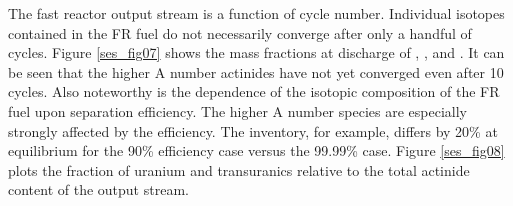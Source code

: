 The fast reactor output stream is a function of cycle number. 
Individual isotopes contained in the FR fuel do not necessarily converge
after only a handful of cycles.  Figure \ref{ses_fig07} shows the mass fractions at
discharge of , ,  and .  
It can be seen that the higher A number actinides have not yet converged even after 10 cycles. 
Also noteworthy is the dependence of the isotopic composition of the FR
fuel upon separation efficiency.  The higher A number species are
especially strongly affected by the efficiency. The 
inventory, for example, differs by 20\% at equilibrium for the 90\%
efficiency case versus the 99.99\% case.  Figure \ref{ses_fig08} plots the fraction of
uranium and transuranics relative to the total actinide content of the
output stream.


